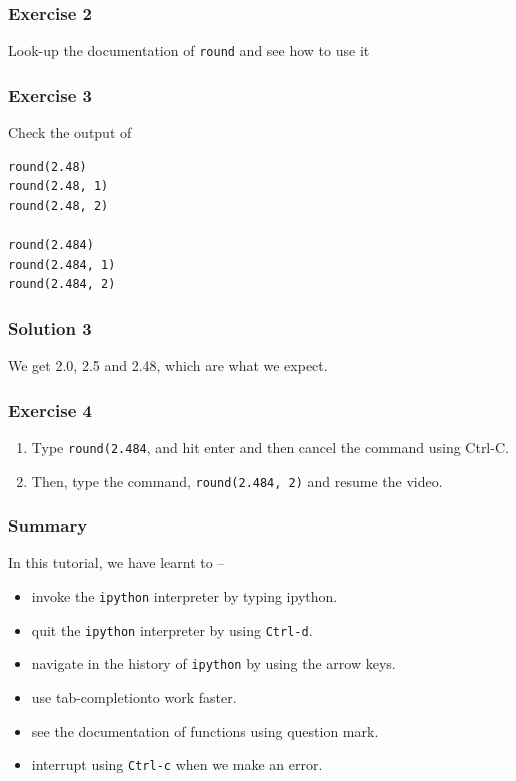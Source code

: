 \documentclass[presentation]{beamer}
\begin{document}
\begin{frame}
\frametitle{Exercise 2}
\label{sec-4}

  Look-up the documentation of \texttt{round} and see how to use it
\end{frame}
\begin{frame}[fragile]
\frametitle{Exercise 3}
\label{sec-5}

  Check the output of
\lstset{language=Python}
\begin{lstlisting}
round(2.48)
round(2.48, 1)
round(2.48, 2)

round(2.484)
round(2.484, 1)
round(2.484, 2)
\end{lstlisting}
\end{frame}
\begin{frame}
\frametitle{Solution 3}
\label{sec-6}

  We get 2.0, 2.5 and 2.48, which are what we expect. 
\end{frame}
\begin{frame}
\frametitle{Exercise 4}
\label{sec-7}


\begin{enumerate}
\item Type \texttt{round(2.484}, and hit enter and then cancel the command
     using Ctrl-C.
\item Then, type the command, \texttt{round(2.484, 2)} and resume
     the video.
\end{enumerate}
\end{frame}
\begin{frame}
\frametitle{Summary}
\label{sec-8}

  In this tutorial, we have learnt to –

\begin{itemize}
\item invoke the \verb~ipython~ interpreter by typing ipython.
\item quit the \verb~ipython~ interpreter by using \verb~Ctrl-d~.
\item navigate in the history of \verb~ipython~ by using the arrow keys.
\item use tab-completionto work faster.
\item see the documentation of functions using question mark.
\item interrupt using \verb~Ctrl-c~ when we make an error.
\end{itemize}
\end{frame}
\end{document}
